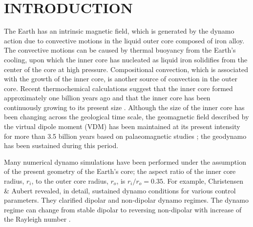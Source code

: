 \section{INTRODUCTION}

{\color{red} %
The Earth has an intrinsic magnetic field, which is generated by the dynamo action due to convective motions in the liquid outer core composed of iron alloy.
}
{\color{red} %
The convective motions can be caused by thermal buoyancy from the Earth's cooling, upon which the inner core has nucleated as liquid iron solidifies from the center of the core at high pressure.
}
{\color{red} %
Compositional convection, which is associated with the growth of the inner core, is another source of convection in the outer core.
}
Recent thermochemical calculations suggest that the inner core formed approximately one billion years ago and that the inner core has been continuously growing to its present size \cite{Labrosse:2001}.
Although the size of the inner core has been changing across the geological time scale, the geomagnetic field described by the virtual dipole moment (VDM) has been maintained at its present intensity for more than 3.5 billion years based on palaeomagnetic studies \cite{Biggin:2015}; the geodynamo has been sustained during this period.

{\color{red}
Many numerical dynamo simulations have been performed under the assumption of the present geometry of the Earth’s core; the aspect ratio of the inner core radius, $r_{i}$, to the outer core radius, $r_{o}$, is $r_{i} / r_{o} = 0.35$.
}
For example, Christensen \& Aubert  revealed, in detail, sustained dynamo conditions for various control parameters. 
They clarified dipolar and non-dipolar dynamo regimes.
The dynamo regime can change from stable dipolar to reversing non-dipolar with increase of the Rayleigh number \cite{Kutzner:2002,Olson:2011}.

